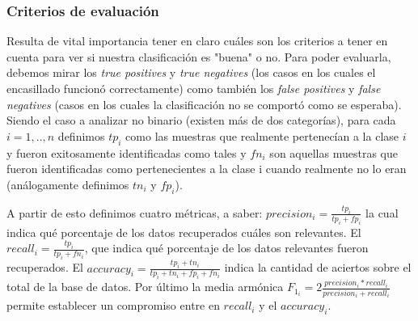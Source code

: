 \subsubsection*{Criterios de evaluaci\'on}
Resulta de vital importancia tener en claro cu\'ales son los criterios a tener en cuenta para ver si nuestra clasificaci\'on es "buena" o no.
Para poder evaluarla, debemos mirar los \textit{true positives} y \textit{true negatives} (los casos en los cuales el encasillado funcion\'o correctamente)
como tambi\'en los \textit{false positives} y \textit{false negatives} (casos en los cuales la clasificaci\'on no se comport\'o como se esperaba).\\
Siendo el caso a analizar no binario (existen m\'as de dos categor\'ias), para cada $i = 1,..,n$  definimos $tp_i$ como
las muestras que realmente pertenec\'ian a la clase $i$ y fueron exitosamente identificadas como tales
y $fn_i$ son aquellas muestras que fueron identificadas como pertenecientes a la clase i cuando realmente no lo eran (an\'alogamente definimos $tn_i$ y $fp_i$).
\par A partir de esto definimos cuatro m\'etricas, a saber:
$precision_i= \frac{tp_i}{tp_i + fp_i}$ la cual indica qu\'e porcentaje de los datos recuperados cu\'ales son relevantes. 
El $recall_i= \frac{tp_i}{tp_i + fn_i}$, que indica qu\'e porcentaje de los datos relevantes fueron recuperados.
El $accuracy_i = \frac{tp_i+tn_i}{tp_i + tn_i + fp_i + fn_i}$ indica la cantidad de aciertos sobre el total de la base de datos.
Por \'ultimo la media arm\'onica $F_{1_i} = 2\frac{precision_i * recall_i}{precision_i + recall_i}$ permite establecer un compromiso entre en 
$recall_i$ y el $accuracy_i$.